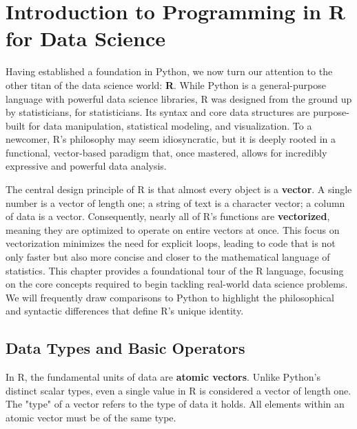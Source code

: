 \chapter{Introduction to Programming in R for Data Science}
\label{chap:r_intro}

Having established a foundation in Python, we now turn our attention to the other titan of the data science world: \textbf{R}. While Python is a general-purpose language with powerful data science libraries, R was designed from the ground up by statisticians, for statisticians. Its syntax and core data structures are purpose-built for data manipulation, statistical modeling, and visualization. To a newcomer, R's philosophy may seem idiosyncratic, but it is deeply rooted in a functional, vector-based paradigm that, once mastered, allows for incredibly expressive and powerful data analysis.

The central design principle of R is that almost every object is a \textbf{vector}. A single number is a vector of length one; a string of text is a character vector; a column of data is a vector. Consequently, nearly all of R's functions are \textbf{vectorized}, meaning they are optimized to operate on entire vectors at once. This focus on vectorization minimizes the need for explicit loops, leading to code that is not only faster but also more concise and closer to the mathematical language of statistics. This chapter provides a foundational tour of the R language, focusing on the core concepts required to begin tackling real-world data science problems. We will frequently draw comparisons to Python to highlight the philosophical and syntactic differences that define R's unique identity.

\section{Data Types and Basic Operators}
\label{sec:r_data_types}
In R, the fundamental units of data are \textbf{atomic vectors}. Unlike Python's distinct scalar types, even a single value in R is considered a vector of length one. The "type" of a vector refers to the type of data it holds. All elements within an atomic vector must be of the same type.


